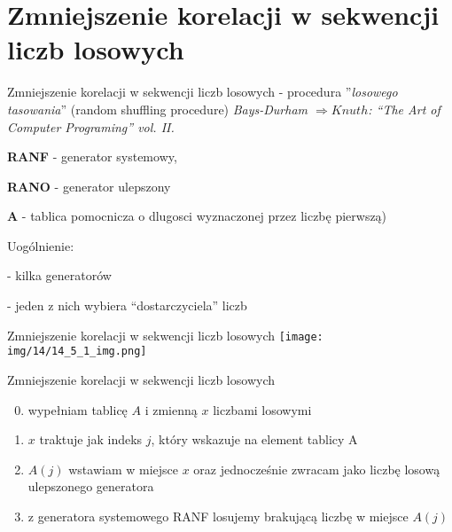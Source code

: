 \section{Zmniejszenie korelacji w sekwencji liczb losowych}
	\begin{frame}{Zmniejszenie korelacji w sekwencji liczb losowych}
	- procedura ''{\it losowego tasowania}'' (random shuffling procedure) {\it Bays-Durham 	$\Rightarrow Knuth$: ``The Art of Computer 	Programing'' vol. II.} 
	\newline 

	\textbf{RANF} - generator systemowy,

	\textbf{RANO} - generator ulepszony

	\textbf{A} - tablica pomocnicza o dlugosci wyznaczonej przez liczbę pierwszą)

\newline \newline
	Uogólnienie:

	- kilka generatorów

	- jeden z nich wybiera ``dostarczyciela'' liczb
	\end{frame}
    
	\begin{frame}{Zmniejszenie korelacji w sekwencji liczb losowych}
		\centering \texttt{[image: img/14/14\_5\_1\_img.png]}
	\end{frame}

	\begin{frame}{Zmniejszenie korelacji w sekwencji liczb losowych}
		\begin{enumerate}
			\setcounter{enumi}{-1}
			\item wypełniam tablicę $A$ i zmienną $x$ liczbami losowymi
			\item $x$ traktuje jak indeks $j$, który wskazuje na  element tablicy A 
			\item $A(j)$ wstawiam w miejsce $x$ oraz jednocześnie zwracam jako liczbę losową  ulepszonego generatora
			\item z generatora systemowego RANF losujemy  brakującą  liczbę w miejsce $A(j)$
		\end{enumerate}
	\end{frame}

	
